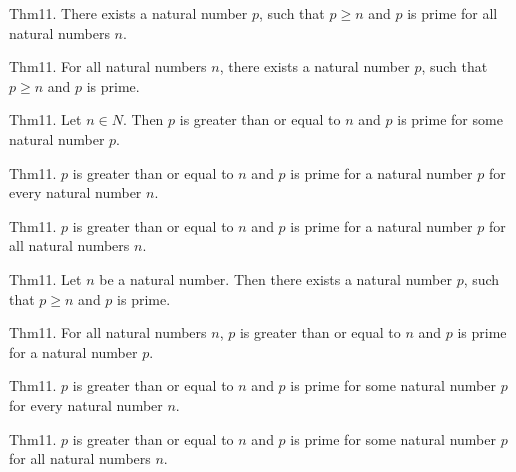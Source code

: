 \documentclass{article}
\begin{document}
Thm11. There exists a natural number $p$, such that $p \geq n$ and $p$ is prime for all natural numbers $n$.

Thm11. For all natural numbers $n$, there exists a natural number $p$, such that $p \geq n$ and $p$ is prime.

Thm11. Let $n \in N$. Then $p$ is greater than or equal to $n$ and $p$ is prime for some natural number $p$.

Thm11. $p$ is greater than or equal to $n$ and $p$ is prime for a natural number $p$ for every natural number $n$.

Thm11. $p$ is greater than or equal to $n$ and $p$ is prime for a natural number $p$ for all natural numbers $n$.

Thm11. Let $n$ be a natural number. Then there exists a natural number $p$, such that $p \geq n$ and $p$ is prime.

Thm11. For all natural numbers $n$, $p$ is greater than or equal to $n$ and $p$ is prime for a natural number $p$.

Thm11. $p$ is greater than or equal to $n$ and $p$ is prime for some natural number $p$ for every natural number $n$.

Thm11. $p$ is greater than or equal to $n$ and $p$ is prime for some natural number $p$ for all natural numbers $n$.
\end{document}
